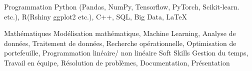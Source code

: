 

\begin{cvskills}

  \cvskill
    {Programmation} %
    {Python (Pandas, NumPy, Tensorflow, PyTorch, Scikit‑learn. etc.), R(Rshiny ggplot2 etc.), C++, SQL, Big Data, \LaTeX} %

  \cvskill
    {Mathématiques} %
    {Modélisation mathématique, Machine Learning, Analyse de données, Traitement de données, Recherche opérationnelle, Optimisation de portefeuille, Programmation linéaire/ non linéaire} %
  \cvskill
    {Soft Skills} %
    {Gestion du temps, Travail en équipe, Résolution de problèmes, Documentation, Présentation} %

\end{cvskills}

